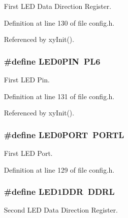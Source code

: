 First L\-E\-D Data Direction Register. 



Definition at line 130 of file config.\-h.



Referenced by xy\-Init().

\hypertarget{group__config_gab0e1f692e2b1fa1cdbb24a9926b3489d}{
\subsubsection[{L\-E\-D0\-P\-I\-N}]{\setlength{\rightskip}{0pt plus 5cm}\#define L\-E\-D0\-P\-I\-N~P\-L6}}\label{group__config_gab0e1f692e2b1fa1cdbb24a9926b3489d}


First L\-E\-D Pin. 



Definition at line 131 of file config.\-h.



Referenced by xy\-Init().

\hypertarget{group__config_gac0f99671c3447a31e5d3755e1f11ee1f}{
\subsubsection[{L\-E\-D0\-P\-O\-R\-T}]{\setlength{\rightskip}{0pt plus 5cm}\#define L\-E\-D0\-P\-O\-R\-T~P\-O\-R\-T\-L}}\label{group__config_gac0f99671c3447a31e5d3755e1f11ee1f}


First L\-E\-D Port. 



Definition at line 129 of file config.\-h.

\hypertarget{group__config_gab0f33b52cdb68e643eba6cf583fb625f}{
\subsubsection[{L\-E\-D1\-D\-D\-R}]{\setlength{\rightskip}{0pt plus 5cm}\#define L\-E\-D1\-D\-D\-R~D\-D\-R\-L}}\label{group__config_gab0f33b52cdb68e643eba6cf583fb625f}


Second L\-E\-D Data Direction Register. 



